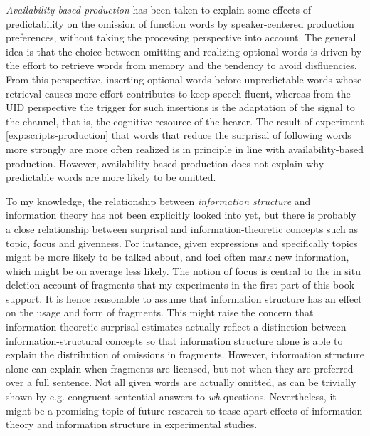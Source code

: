 \textit{Availability-based production} \citep{ferreira.dell2000} has been taken to explain some effects of predictability on the omission of function words by speaker-centered production preferences, without taking the processing perspective into account. The general idea is that the choice between omitting and realizing optional words is driven by the effort to retrieve words from memory and the tendency to avoid disfluencies. From this perspective, inserting optional words before unpredictable words whose retrieval causes more effort contributes to keep speech fluent, whereas from the UID perspective the trigger for such insertions is the adaptation of the signal to the channel, that is, the cognitive resource of the hearer. The result of experiment \ref{exp:scripts-production} that words that reduce the surprisal of following words more strongly are more often realized is in principle in line with availability-based production. However, availability-based production does not explain why predictable words are more likely to be omitted.

To my knowledge, the relationship between \textit{information structure} and information theory has not been explicitly looked into yet, but there is probably a close relationship between surprisal and information-theoretic concepts such as topic, focus and givenness. For instance, given expressions and specifically topics might be more likely to be talked about, and foci often mark new information, which might be on average less likely. The notion of focus is central to the in situ deletion account of fragments that my experiments in the first part of this book support. It is hence reasonable to assume that information structure has an effect on the usage and form of fragments. This might raise the concern that information-theoretic surprisal estimates actually reflect a distinction between information-structural concepts so that information structure alone is able to explain the distribution of omissions in fragments. However, information structure alone can explain when fragments are licensed, but not when they are preferred over a full sentence. Not all given words are actually omitted, as can be trivially shown by e.g. congruent sentential answers to \textit{wh}-questions. Nevertheless, it might be a promising topic of future research to tease apart effects of information theory and information structure in experimental studies.

